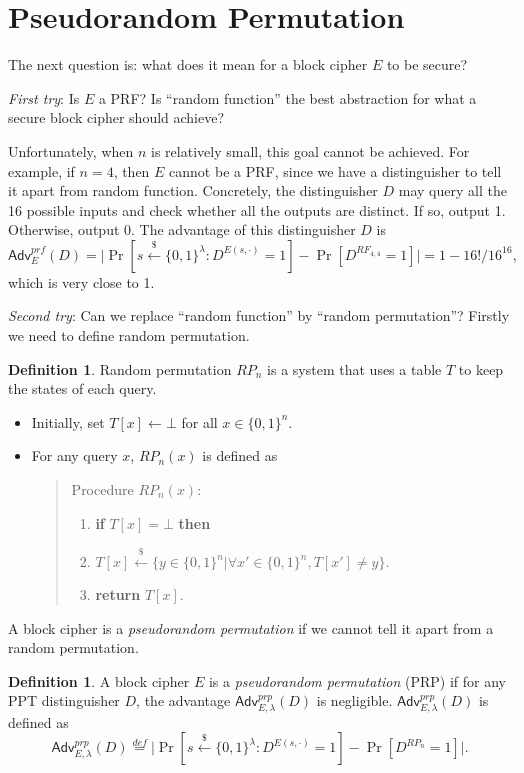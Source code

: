 \documentclass[12pt]{article}
\newcommand{\eqdef}{\stackrel{def}{=}}
\newcommand{\bits}{\{0,1\}}
\newcommand{\getsr}{\stackrel{\$}{\gets}}
\newcommand{\Adv}{\mathsf{Adv}}
\newcommand{\tab}{\hspace{0.3in}}
\theoremstyle{definition}
\newtheorem{definition}[theorem]{Definition}
\begin{document}
\section{Pseudorandom Permutation}
The next question is: what does it mean for a block cipher $E$ to be secure?

\emph{First try}: Is $E$ a PRF? Is ``random function'' the best abstraction for what a secure block cipher should achieve?

Unfortunately, when $n$ is relatively small, this goal cannot be achieved. For example, if $n=4$, then $E$ cannot be a PRF, since we have a distinguisher to tell it apart from random function. Concretely, the distinguisher $D$ may query all the 16 possible inputs and check whether all the outputs are distinct. If so, output 1. Otherwise, output 0. The advantage of this distinguisher $D$ is
$$
\Adv_{E}^{prf}(D) = \bigg|\Pr[s\getsr\bits^\lambda : D^{E(s,\cdot)}=1]-\Pr[D^{RF_{4,4}}=1] \bigg| = 1 - 16!/16^{16},
$$
which is very close to 1.

\emph{Second try}: Can we replace ``random function'' by ``random permutation''? Firstly we need to define random permutation.
\begin{definition}
Random permutation $RP_n$ is a system that uses a table $T$ to keep the states of each query. 
\begin{itemize}
\item Initially, set $T[x] \gets \bot$ for all $x \in \bits^n$.
\item For any query $x$, $RP_n(x)$ is defined as
\begin{quote}
Procedure $RP_n(x)$:
\begin{enumerate}
\item {\bf if} $T[x]=\bot$ {\bf then}
\item \tab $T[x] \getsr \{y \in \bits^n | \forall x' \in \bits^n, T[x'] \not= y\}.$
\item {\bf return} $T[x]$.
\end{enumerate}
\end{quote}
\end{itemize}
\end{definition}

A block cipher is a \emph{pseudorandom permutation} if we cannot tell it apart from a random permutation.

\begin{definition}
A block cipher $E$ is a \emph{pseudorandom permutation} (PRP) if for any PPT distinguisher $D$, the advantage $\Adv_{E,\lambda}^{prp}(D)$ is negligible. $\Adv_{E,\lambda}^{prp}(D)$ is defined as
$$\Adv_{E,\lambda}^{prp}(D) \eqdef \bigg| \Pr[s \getsr \bits^\lambda : D^{E(s,\cdot)} = 1] - \Pr[D^{RP_n}=1] \bigg|.$$
\end{definition}
\end{document}
